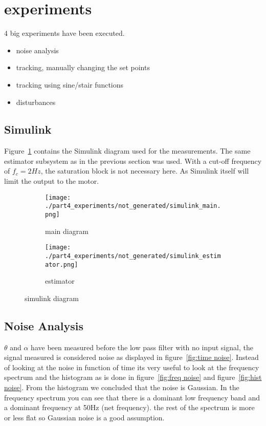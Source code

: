\section{experiments}

	4 big experiments have been executed.
	
	\begin{itemize}
		\item noise analysis
		\item tracking, manually changing the set points
		\item tracking using sine/stair functions
		\item disturbances
	\end{itemize}

\subsection{Simulink}
Figure~\ref{fig:simulink measurement diagram} contains the Simulink diagram used for the measurements. The same estimator subsystem as in the previous section was used. With a cut-off frequency of $f_c=2Hz$, the saturation block is not necessary here. As Simulink itself will limit the output to the motor.
	\begin{figure}[H]
	\centering
	\begin{subfigure}[b]{0.55\textwidth}
		\texttt{[image: ./part4\_experiments/not\_generated/simulink\_main.png]}
		\caption{main diagram}
	\end{subfigure}
	\begin{subfigure}[b]{0.45\textwidth}
		\texttt{[image: ./part4\_experiments/not\_generated/simulink\_estimator.png]}
		\caption{estimator}
	\end{subfigure}
	\caption{simulink diagram}
	\label{fig:simulink measurement diagram}
\end{figure}

\subsection{Noise Analysis}
	$\theta$ and $\alpha$ have been measured before the low pass filter with no input signal, the signal measured is considered noise as displayed in figure~\ref{fig:time noise}. Instead of looking at the noise in function of time its very useful to look at the frequency spectrum and the histogram as is done in figure~\ref{fig:freq noise} and figure~\ref{fig:hist noise}. From the histogram we concluded that the noise is Gaussian. In the frequency spectrum you can see that there is a dominant low frequency band and a dominant frequency at 50Hz (net frequency). the rest of the spectrum is more or less flat so Gaussian noise is a good assumption.
	
